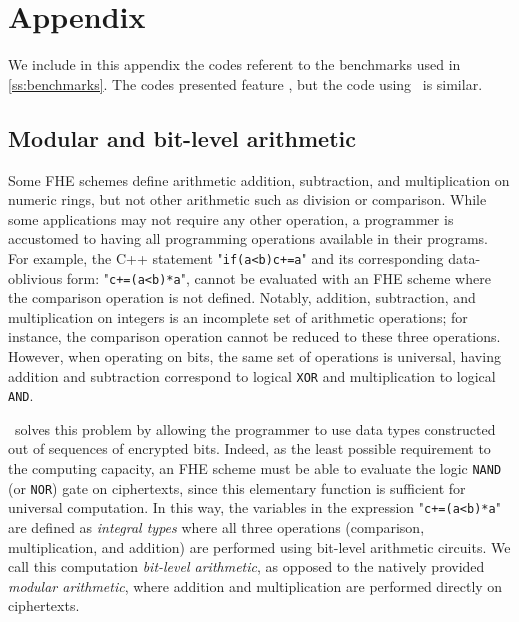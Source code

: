 \vspace{-0.8cm}
\section*{Appendix}
\vspace{-0.2cm}
We include in this appendix the codes referent to the benchmarks used in \ref{ss:benchmarks}. The codes presented feature \secint, but the code using \secuint\ is similar.

\vspace{-0.1cm}

\vspace{-1.3cm}















\subsection{Modular and bit-level arithmetic}\label{ss:modcom}

Some FHE schemes define arithmetic addition, subtraction, and multiplication on numeric rings, but not other arithmetic such as division or comparison. While some applications may not require any other operation, a programmer is accustomed to having all programming operations available in their programs.
For example, the C++ statement "{\tt{}if(a<b)c+=a}" and its corresponding data-oblivious form: "{\tt{}c+=(a<b)*a}", cannot be evaluated with an FHE scheme where the comparison operation is not defined.
Notably, addition, subtraction, and multiplication on integers is an incomplete set of arithmetic operations; for instance, the comparison operation cannot be reduced to these three operations. However, when operating on bits, the same set of operations is universal, having addition and subtraction correspond to logical \texttt{XOR} and multiplication to logical \texttt{AND}.

\eee\ solves this problem by allowing the programmer to use data types constructed out of sequences of encrypted bits. Indeed, as the least possible requirement to the computing capacity, an FHE scheme must be able to evaluate the logic \texttt{NAND} (or \texttt{NOR}) gate on ciphertexts, since this elementary function is sufficient for universal computation. 
In this way, the variables in the expression "{\tt{}c+=(a<b)*a}" are defined as \emph{integral types} where all three operations (comparison, multiplication, and addition) are performed using bit-level arithmetic circuits. We call this computation {\it bit-level arithmetic}, as opposed to the natively provided {\it modular arithmetic}, where addition and multiplication are performed directly on ciphertexts.

